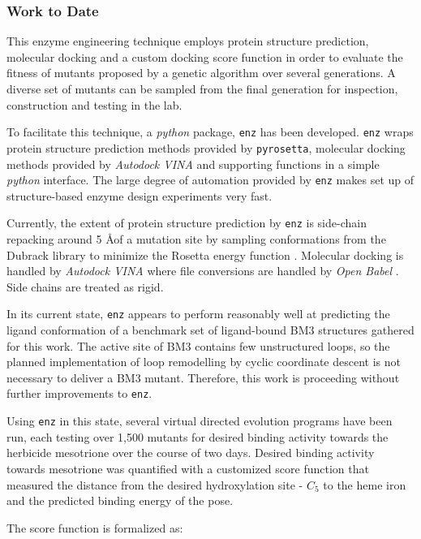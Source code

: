 \documentclass{article}
\begin{document}
\subsubsection{Work to Date}
This enzyme engineering technique employs protein structure prediction, molecular docking and a custom docking score function in order to evaluate the fitness of mutants proposed by a genetic algorithm over several generations. A diverse set of mutants can be sampled from the final generation for inspection, construction and testing in the lab. 
\par
To facilitate this technique, a \textit{python} package, \texttt{enz} has been developed. \texttt{enz} wraps protein structure prediction methods provided by \texttt{pyrosetta}\cite{chaudhury2010pyrosetta}, molecular docking methods provided by \textit{Autodock VINA} \cite{trott2010autodock} and supporting functions in a simple \textit{python} interface. The large degree of automation provided by \texttt{enz} makes set up of structure-based enzyme design experiments very fast.
\par 
Currently, the extent of protein structure prediction by \texttt{enz} is side-chain repacking around 5 \AA of a mutation site by sampling conformations from the Dubrack library \cite{dunbrack1993backbone} to minimize the Rosetta energy function \cite{park2016simultaneous}.
Molecular docking is handled by \textit{Autodock VINA} where file conversions are handled by \textit{Open Babel} \cite{o2011open}. Side chains are treated as rigid.
\par
In its current state, \texttt{enz} appears to perform reasonably well at predicting the ligand conformation of a benchmark set of ligand-bound BM3 structures gathered for this work. The active site of BM3 contains few unstructured loops, so the planned implementation of loop remodelling by cyclic coordinate descent \cite{canutescu2003cyclic} is not necessary to deliver a BM3 mutant. Therefore, this work is proceeding without further improvements to \texttt{enz}.
\par
Using \texttt{enz} in this state, several virtual directed evolution programs have been run, each testing over 1,500 mutants for desired binding activity towards the herbicide mesotrione over the course of two days. Desired binding activity towards mesotrione was quantified with a customized score function that measured the distance from the desired hydroxylation site - $C_5$ to the heme iron and the predicted binding energy of the pose. 
\par 
The score function is formalized as:
\end{document}
